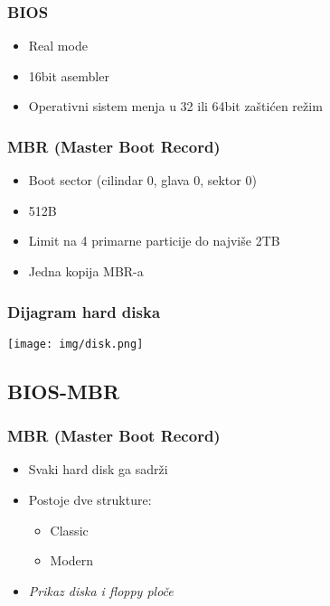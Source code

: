 \documentclass{beamer}
\begin{document}
\begin{frame}
    \frametitle{BIOS}
    \begin{itemize}
        \item Real mode \newline
        \item 16bit asembler \newline
        \item Operativni sistem menja u 32 ili 64bit zaštićen režim
    \end{itemize}
\end{frame}

\begin{frame}
    \frametitle{MBR (Master Boot Record)}
    \begin{itemize}
        \item Boot sector (cilindar 0, glava 0, sektor 0) \newline
        \item 512B \newline
        \item Limit na 4 primarne particije do najviše 2TB \newline
        \item Jedna kopija MBR-a \newline
    \end{itemize}
\end{frame}

\begin{frame}
    \frametitle{Dijagram hard diska}
    \begin{center}
        \texttt{[image: img/disk.png]}
    \end{center}
\end{frame}

\subsection*{BIOS-MBR}
\begin{frame}
    \frametitle{MBR (Master Boot Record)}
    \begin{itemize}
        \item Svaki hard disk ga sadrži \newline
        \item Postoje dve strukture: \begin{itemize}
            \item Classic \newline
            \item Modern \newline
        \end{itemize}
        \item \textit{Prikaz diska i floppy ploče}
    \end{itemize}
\end{frame}
\end{document}

